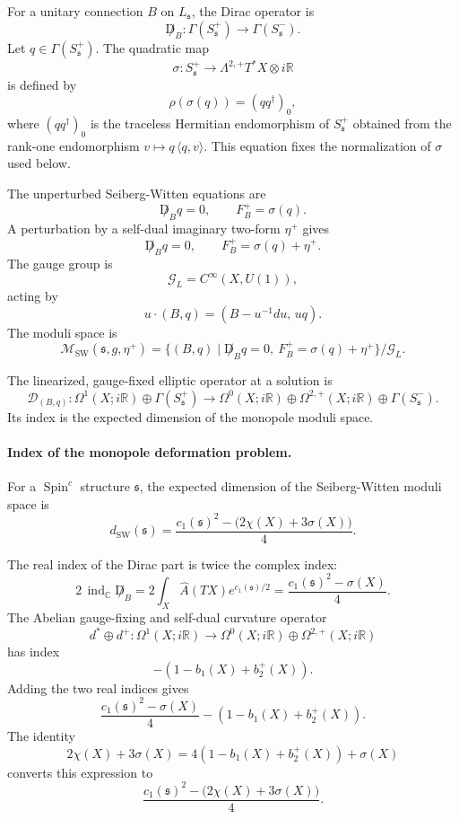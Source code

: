 For a unitary connection \(B\) on \(L_{\mathfrak s}\), the Dirac operator is
\[
  \not D_B:\Gamma(S^+_{\mathfrak s})\longrightarrow
  \Gamma(S^-_{\mathfrak s}).
\]
Let \(q\in\Gamma(S^+_{\mathfrak s})\).  The quadratic map
\[
  \sigma:S^+_{\mathfrak s}\longrightarrow\Lambda^{2,+}T^*X\otimes i\mathbb R
\]
is defined by
\[
  \rho(\sigma(q))=(q q^\dagger)_0 ,
\]
where \((q q^\dagger)_0\) is the traceless Hermitian endomorphism of
\(S^+_{\mathfrak s}\) obtained from the rank-one endomorphism
\(v\mapsto q\,\langle q,v\rangle\).  This equation fixes the normalization of
\(\sigma\) used below.

The unperturbed Seiberg-Witten equations are
\[
  \not D_B q=0,
  \qquad
  F_B^+=\sigma(q).
\]
A perturbation by a self-dual imaginary two-form \(\eta^+\) gives
\[
  \not D_B q=0,
  \qquad
  F_B^+=\sigma(q)+\eta^+ .
\]
The gauge group is
\[
  \mathcal G_L=C^\infty(X,U(1)),
\]
acting by
\[
  u\cdot(B,q)=(B-u^{-1}du,\,uq).
\]
The moduli space is
\[
  \mathcal M_{\mathrm{SW}}(\mathfrak s,g,\eta^+)
  =
  \{(B,q)\mid \not D_Bq=0,\ F_B^+=\sigma(q)+\eta^+\}/\mathcal G_L .
\]

The linearized, gauge-fixed elliptic operator at a solution is
\[
  \mathcal D_{(B,q)}:
  \Omega^1(X;i\mathbb R)\oplus\Gamma(S^+_{\mathfrak s})
  \longrightarrow
  \Omega^0(X;i\mathbb R)\oplus
  \Omega^{2,+}(X;i\mathbb R)\oplus\Gamma(S^-_{\mathfrak s}) .
\]
Its index is the expected dimension of the monopole moduli space.

\paragraph{Index of the monopole deformation problem.}
For a \(\operatorname{Spin}^c\) structure \(\mathfrak s\), the expected
dimension of the Seiberg-Witten moduli space is
\[
  d_{\mathrm{SW}}(\mathfrak s)
  =
  \frac{c_1(\mathfrak s)^2-\bigl(2\chi(X)+3\sigma(X)\bigr)}{4}.
\]

The real index of the Dirac part is twice the complex index:
\[
  2\,\operatorname{ind}_{\mathbb C}\not D_B
  =
  2\int_X \widehat A(TX)e^{c_1(\mathfrak s)/2}
  =
  \frac{c_1(\mathfrak s)^2-\sigma(X)}{4}.
\]
The Abelian gauge-fixing and self-dual curvature operator
\[
  d^*\oplus d^+:\Omega^1(X;i\mathbb R)
  \longrightarrow
  \Omega^0(X;i\mathbb R)\oplus\Omega^{2,+}(X;i\mathbb R)
\]
has index
\[
  -(1-b_1(X)+b_2^+(X)).
\]
Adding the two real indices gives
\[
  \frac{c_1(\mathfrak s)^2-\sigma(X)}{4}
  -(1-b_1(X)+b_2^+(X)).
\]
The identity
\[
  2\chi(X)+3\sigma(X)
  =
  4(1-b_1(X)+b_2^+(X))+\sigma(X)
\]
converts this expression to
\[
  \frac{c_1(\mathfrak s)^2-\bigl(2\chi(X)+3\sigma(X)\bigr)}{4}.
\]

